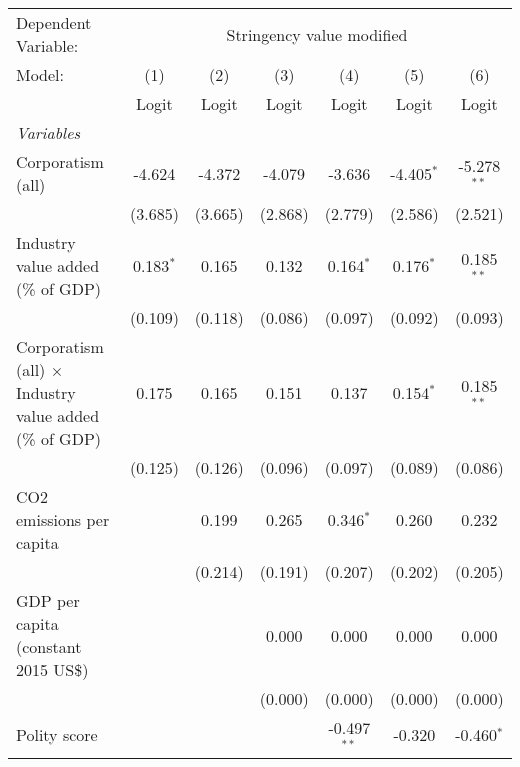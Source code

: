 
\begingroup
\centering
\begin{tabular}{lcccccc}
   \toprule
   Dependent Variable: & \multicolumn{6}{c}{Stringency value modified}\\
   Model:                                                        & (1)         & (2)     & (3)     & (4)           & (5)          & (6)\\  
                                                                 &  Logit      & Logit   & Logit   & Logit         & Logit        & Logit\\  
   \midrule
   \emph{Variables}\\
   Corporatism (all)                                             & -4.624      & -4.372  & -4.079  & -3.636        & -4.405$^{*}$ & -5.278$^{**}$\\   
                                                                 & (3.685)     & (3.665) & (2.868) & (2.779)       & (2.586)      & (2.521)\\   
   Industry value added (\% of GDP)                              & 0.183$^{*}$ & 0.165   & 0.132   & 0.164$^{*}$   & 0.176$^{*}$  & 0.185$^{**}$\\   
                                                                 & (0.109)     & (0.118) & (0.086) & (0.097)       & (0.092)      & (0.093)\\   
   Corporatism (all) $\times$ Industry value added (\% of GDP)   & 0.175       & 0.165   & 0.151   & 0.137         & 0.154$^{*}$  & 0.185$^{**}$\\   
                                                                 & (0.125)     & (0.126) & (0.096) & (0.097)       & (0.089)      & (0.086)\\   
   CO2 emissions per capita                                      &             & 0.199   & 0.265   & 0.346$^{*}$   & 0.260        & 0.232\\   
                                                                 &             & (0.214) & (0.191) & (0.207)       & (0.202)      & (0.205)\\   
   GDP per capita (constant 2015 US\$)                           &             &         & 0.000   & 0.000         & 0.000        & 0.000\\   
                                                                 &             &         & (0.000) & (0.000)       & (0.000)      & (0.000)\\   
   Polity score                                                  &             &         &         & -0.497$^{**}$ & -0.320       & -0.460$^{*}$\\   

\end{tabular}
